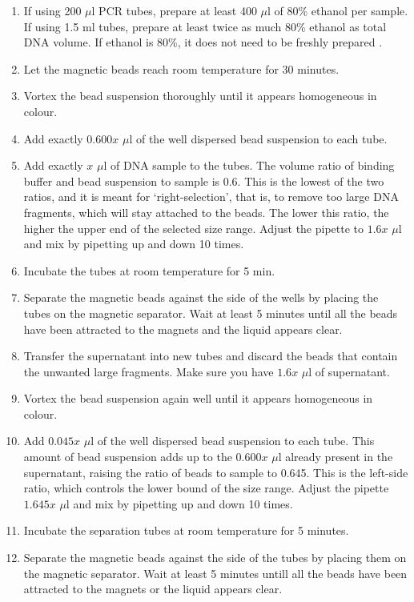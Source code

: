 \documentclass[a4paper,12pt]{article}
\begin{document}
\begin{enumerate}
\item If using 200 $\mu$l PCR tubes, prepare at least 400 $\mu$l of 80\% ethanol per sample. If using 1.5 ml tubes, prepare at least twice as much 80\% ethanol as total DNA volume. If ethanol is 80\%, it does not need to be freshly prepared \cite{Bronner2009}.
\item Let the magnetic beads reach room temperature for 30 minutes.
\item Vortex the bead suspension thoroughly until it appears homogeneous in colour.
\item Add exactly $0.600x$ $\mu$l of the well dispersed bead suspension to each tube.
\item Add exactly $x$ $\mu$l of DNA sample to the tubes. The volume ratio of binding buffer and bead suspension to sample is 0.6. This is the lowest of the two ratios, and it is meant for `right-selection', that is, to remove too large DNA fragments, which will stay attached to the beads. The lower this ratio, the higher the upper end of the selected size range. Adjust the pipette to $1.6x$ $\mu$l and mix by pipetting up and down 10 times.
\item Incubate the tubes at room temperature for 5 min.
\item Separate the magnetic beads against the side of the wells by placing the tubes on the magnetic separator. Wait at least 5 minutes until all the beads have been attracted to the magnets and the liquid appears clear.
\item Transfer the supernatant into new tubes and discard the beads that contain the unwanted large fragments. Make sure you have $1.6x$ $\mu$l of supernatant.
\item Vortex the bead suspension again well until it appears homogeneous in colour.
\item Add $0.045x$ $\mu$l of the well dispersed bead suspension to each tube. This amount of bead suspension adds up to the $0.600x$ $\mu$l already present in the supernatant, raising the ratio of beads to sample to 0.645. This is the left-side ratio, which controls the lower bound of the size range. Adjust the pipette $1.645x$ $\mu$l and mix by pipetting up and down 10 times.
\item Incubate the separation tubes at room temperature for 5 minutes.
\item Separate the magnetic beads against the side of the tubes by placing them on the magnetic separator. Wait at least 5 minutes untill all the beads have been attracted to the magnets or the liquid appears clear.

\end{enumerate}
\end{document}
